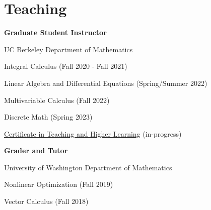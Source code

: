 \section{\sc Teaching}


{\bf{Graduate Student Instructor}}
\begin{list1}
\item[] UC Berkeley Department of Mathematics
\begin{list2}
\item[$\circ$] Integral Calculus (Fall 2020 - Fall 2021)
\item[$\circ$] Linear Algebra and Differential Equations (Spring/Summer 2022)
\item[$\circ$]  Multivariable Calculus (Fall 2022)
\item[$\circ$]  Discrete Math (Spring 2023)
\item[$\circ$] \href{https://gsi.berkeley.edu/programs-services/certificate-program/}{Certificate in Teaching and Higher Learning} (in-progress)
\end{list2}
\end{list1}

{\bf{Grader and Tutor}}
\begin{list1}
\item[] University of Washington Department of Mathematics
\begin{list2}
\item[$\circ$] Nonlinear Optimization (Fall 2019)
\item [$\circ$] Vector Calculus (Fall 2018)
\end{list2}
\end{list1}


